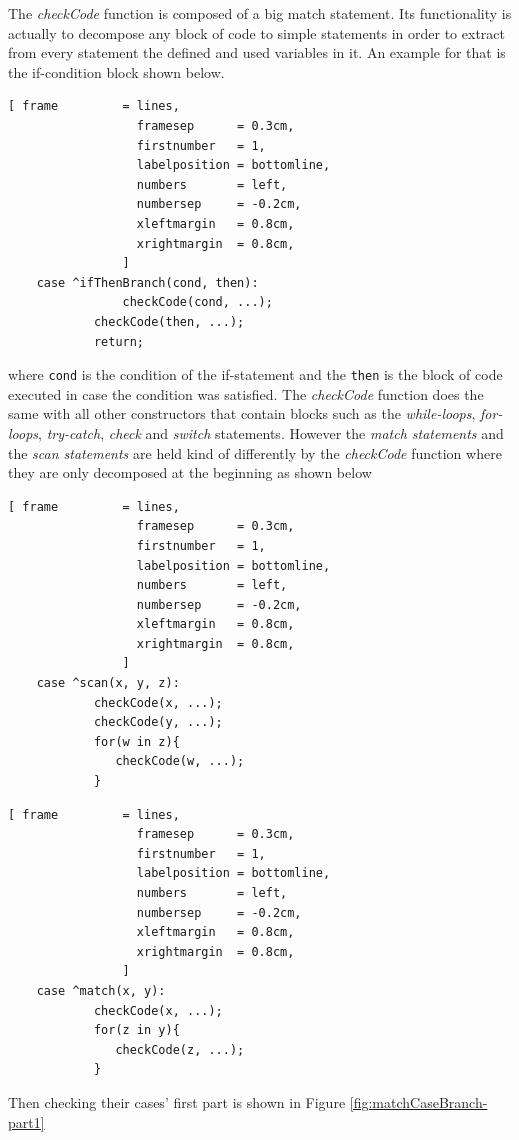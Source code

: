 \documentclass[11pt]{report}
\begin{document}
The \textsl{checkCode} function is composed of a big match statement. Its functionality is actually to decompose any block of code to simple statements in order to extract from every statement the defined and used variables in it. An example for that is the if-condition block shown below.
\begin{Verbatim}[ frame         = lines, 
                  framesep      = 0.3cm, 
                  firstnumber   = 1,
                  labelposition = bottomline,
                  numbers       = left,
                  numbersep     = -0.2cm,
                  xleftmargin   = 0.8cm,
                  xrightmargin  = 0.8cm,
                ]
    case ^ifThenBranch(cond, then): 
        		checkCode(cond, ...);
			checkCode(then, ...);
			return;
\end{Verbatim}
where \texttt{cond} is the condition of the if-statement and the \texttt{then} is the block of code executed in case the condition was satisfied. The \textsl{checkCode} function does the same with all other constructors that contain blocks such as the \textsl{while-loops}, \textsl{for-loops}, \textsl{try-catch}, \textsl{check} and \textsl{switch} statements. However the \textsl{match statements} and the \textsl{scan statements} are held kind of differently by the \textsl{checkCode} function where they are only decomposed at the beginning as shown below
\begin{Verbatim}[ frame         = lines, 
                  framesep      = 0.3cm, 
                  firstnumber   = 1,
                  labelposition = bottomline,
                  numbers       = left,
                  numbersep     = -0.2cm,
                  xleftmargin   = 0.8cm,
                  xrightmargin  = 0.8cm,
                ]
    case ^scan(x, y, z): 
    		checkCode(x, ...);
    		checkCode(y, ...);
	    	for(w in z){
	       	   checkCode(w, ...);
	    	}
\end{Verbatim}
\begin{Verbatim}[ frame         = lines, 
                  framesep      = 0.3cm, 
                  firstnumber   = 1,
                  labelposition = bottomline,
                  numbers       = left,
                  numbersep     = -0.2cm,
                  xleftmargin   = 0.8cm,
                  xrightmargin  = 0.8cm,
                ]
    case ^match(x, y): 
    		checkCode(x, ...);
	    	for(z in y){
	       	   checkCode(z, ...);
	    	} 
\end{Verbatim}
Then checking their cases' first part is shown in Figure \ref{fig:matchCaseBranch-part1}
\end{document}
